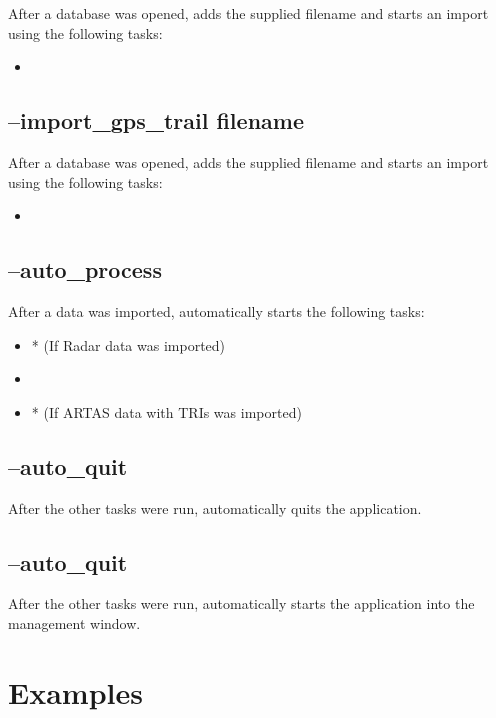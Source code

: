After a database was opened, adds the supplied filename and starts an import using the following tasks:

\begin{itemize}
 \item {}
\end{itemize}

\subsection{--import\_gps\_trail filename}

After a database was opened, adds the supplied filename and starts an import using the following tasks:

\begin{itemize}
 \item {}
\end{itemize}

\subsection{--auto\_process}

After a data was imported, automatically starts the following tasks:

\begin{itemize}
 \item {}* (If Radar data was imported)
 \item {}
 \item {}* (If ARTAS data with TRIs was imported)
\end{itemize}

\subsection{--auto\_quit}

After the other tasks were run, automatically quits the application.

\subsection{--auto\_quit}

After the other tasks were run, automatically starts the application into the management window.


\section{Examples}

